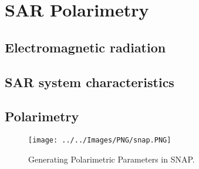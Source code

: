\chapter{SAR Polarimetry}\label{chp:obs}%


\section{Electromagnetic radiation}
\section{SAR system characteristics} \label{sec:pr_obs}
\section{Polarimetry}

	\begin{figure}[H]
    \centering
    \texttt{[image: ../../Images/PNG/snap.PNG]}
    \decoRule
    \caption[Generating Polarimetric Parameters in SNAP]{Generating Polarimetric Parameters in SNAP.}
    \label{fig:undercatch}
\end{figure}

	



